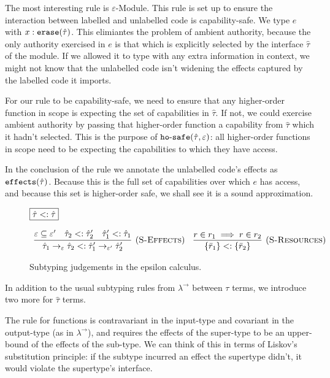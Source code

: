 \noindent
The most interesting rule is $\varepsilon$-Module. This rule is set up to ensure the interaction between labelled and unlabelled code is capability-safe. We type $e$ with $x: \mathtt{erase}(\hat \tau)$. This elimiantes the problem of ambient authority, because the only authority exercised in $e$ is that which is explicitly selected by the interface $\hat \tau$ of the module. If we allowed it to type with any extra information in context, we might not know that the unlabelled code isn't widening the effects captured by the labelled code it imports.

For our rule to be capability-safe, we need to ensure that any higher-order function in scope is expecting the set of capabilities in $\hat \tau$. If not, we could exercise ambient authority by passing that higher-order function a capability from $\hat \tau$ which it hadn't selected. This is the purpose of $\mathtt{ho \hbox{-} safe}(\hat \tau, \varepsilon)$: all higher-order functions in scope need to be expecting the capabilities to which they have access.

In the conclusion of the rule we annotate the unlabelled code's effects as $\mathtt{effects}(\hat \tau)$. Because this is the full set of capabilities over which $e$ has access, and because this set is higher-order safe, we shall see it is a sound approximation. 



\begin{figure}[h]
\noindent
$\fbox{$\hat \tau <: \hat \tau$}$

\[
\begin{array}{c}

\infer[(\textsc{S-Effects})]
	{\hat \tau_1 \rightarrow_{\varepsilon} \hat \tau_2 <: \hat \tau_1' \rightarrow_{\varepsilon'} \hat \tau_2'}
	{\varepsilon \subseteq \varepsilon' & \hat \tau_2 <: \hat \tau_2' & \hat \tau_1' <: \hat \tau_1}
~~~
\infer[(\textsc{S-Resources})]
	{ \{ \bar r_1 \} <: \{ \bar r_2 \} }
	{ r \in r_1 \implies r \in r_2 }

\end{array}
\]
\vspace{-7pt}
\caption{Subtyping judgements in the epsilon calculus.}
\label{This is the label.}
\end{figure}

\noindent
In addition to the usual subtyping rules from $\lambda^{\rightarrow}$ between $\tau$ terms, we introduce two more for $\hat \tau$ terms. 

The rule for functions is contravariant in the input-type and covariant in the output-type (as in $\lambda^{\rightarrow}$), and requires the effects of the super-type to be an upper-bound of the effects of the sub-type. We can think of this in terms of Liskov's substitution principle: if the subtype incurred an effect the supertype didn't, it would violate the supertype's interface.


